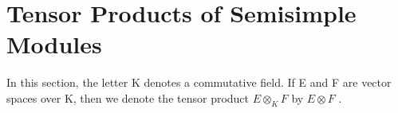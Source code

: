 \section{Tensor Products of Semisimple Modules}

In this section, the letter K denotes a commutative field. If E and F are vector spaces over K, then we denote the tensor product \(E \otimes_{K} F\) by \(E \otimes F\) .

